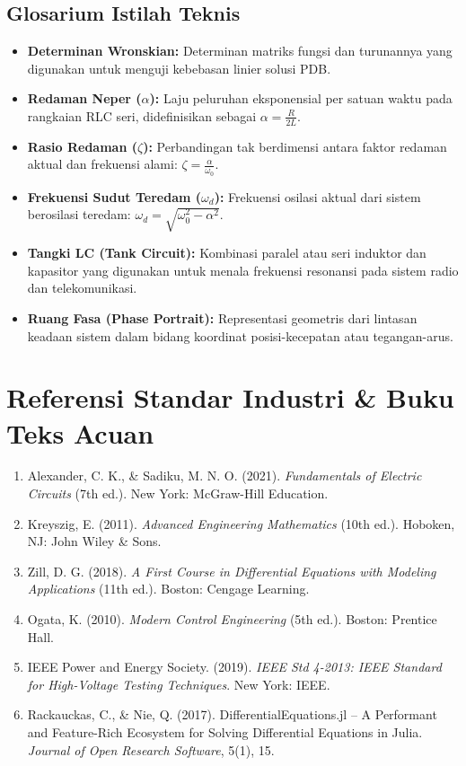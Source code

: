 \documentclass[11pt,a4paper]{article}
\theoremstyle{definition}
\begin{document}
\subsection{Glosarium Istilah Teknis}
\begin{itemize}[leftmargin=*]
    \item \textbf{Determinan Wronskian:} Determinan matriks fungsi dan turunannya yang digunakan untuk menguji kebebasan linier solusi PDB.
    \item \textbf{Redaman Neper ($\alpha$):} Laju peluruhan eksponensial per satuan waktu pada rangkaian RLC seri, didefinisikan sebagai $\alpha = \frac{R}{2L}$.
    \item \textbf{Rasio Redaman ($\zeta$):} Perbandingan tak berdimensi antara faktor redaman aktual dan frekuensi alami: $\zeta = \frac{\alpha}{\omega_0}$.
    \item \textbf{Frekuensi Sudut Teredam ($\omega_d$):} Frekuensi osilasi aktual dari sistem berosilasi teredam: $\omega_d = \sqrt{\omega_0^2 - \alpha^2}$.
    \item \textbf{Tangki LC (Tank Circuit):} Kombinasi paralel atau seri induktor dan kapasitor yang digunakan untuk menala frekuensi resonansi pada sistem radio dan telekomunikasi.
    \item \textbf{Ruang Fasa (Phase Portrait):} Representasi geometris dari lintasan keadaan sistem dalam bidang koordinat posisi-kecepatan atau tegangan-arus.
\end{itemize}

\section{Referensi Standar Industri \& Buku Teks Acuan}
\begin{enumerate}[leftmargin=*]
    \item Alexander, C. K., \& Sadiku, M. N. O. (2021). \textit{Fundamentals of Electric Circuits} (7th ed.). New York: McGraw-Hill Education.
    \item Kreyszig, E. (2011). \textit{Advanced Engineering Mathematics} (10th ed.). Hoboken, NJ: John Wiley \& Sons.
    \item Zill, D. G. (2018). \textit{A First Course in Differential Equations with Modeling Applications} (11th ed.). Boston: Cengage Learning.
    \item Ogata, K. (2010). \textit{Modern Control Engineering} (5th ed.). Boston: Prentice Hall.
    \item IEEE Power and Energy Society. (2019). \textit{IEEE Std 4-2013: IEEE Standard for High-Voltage Testing Techniques}. New York: IEEE.
    \item Rackauckas, C., \& Nie, Q. (2017). DifferentialEquations.jl -- A Performant and Feature-Rich Ecosystem for Solving Differential Equations in Julia. \textit{Journal of Open Research Software}, 5(1), 15.
\end{enumerate}
\end{document}
